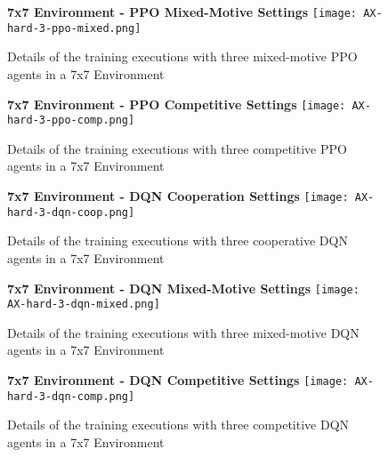 \newpage
\vfill
\begin{figure}
    \centering
    \textbf{7x7 Environment - PPO Mixed-Motive Settings}
    \texttt{[image: AX-hard-3-ppo-mixed.png]}\\
    \caption[Training Details of PPO Mixed-Motive Executions in a 7x7 Environment]{Details of the training executions with three mixed-motive PPO agents in a 7x7 Environment}\label{fig:ax-hard-2-ppo-mixed}
\end{figure}
\vfill
\clearpage


\newpage
\vfill
\begin{figure}
    \centering
    \textbf{7x7 Environment - PPO Competitive Settings}
    \texttt{[image: AX-hard-3-ppo-comp.png]}\\
    \caption[Training Details of PPO Competitive Executions in a 7x7 Environment]{Details of the training executions with three competitive PPO agents in a 7x7 Environment}\label{fig:ax-hard-2-ppo-comp}
\end{figure}
\vfill
\clearpage

\newpage
\vfill
\begin{figure}
    \centering
    \textbf{7x7 Environment - DQN Cooperation Settings}
    \texttt{[image: AX-hard-3-dqn-coop.png]}\\
    \caption[Training Details of DQN Cooperation Executions in a 7x7 Environment]{Details of the training executions with three cooperative DQN agents in a 7x7 Environment}\label{fig:ax-hard-2-dqn-coop}
\end{figure}
\vfill
\clearpage


\newpage
\vfill
\begin{figure}
    \centering
    \textbf{7x7 Environment - DQN Mixed-Motive Settings}
    \texttt{[image: AX-hard-3-dqn-mixed.png]}\\
    \caption[Training Details of DQN Mixed-Motive Executions in a 7x7 Environment]{Details of the training executions with three mixed-motive DQN agents in a 7x7 Environment}\label{fig:ax-hard-2-dqn-mixed}
\end{figure}
\vfill
\clearpage


\newpage
\vfill
\begin{figure}
    \centering
    \textbf{7x7 Environment - DQN Competitive Settings}
    \texttt{[image: AX-hard-3-dqn-comp.png]}\\
    \caption[Training Details of DQN Competitive Executions in a 7x7 Environment]{Details of the training executions with three competitive DQN agents in a 7x7 Environment}\label{fig:ax-hard-2-dqn-comp}
\end{figure}
\vfill
\clearpage



